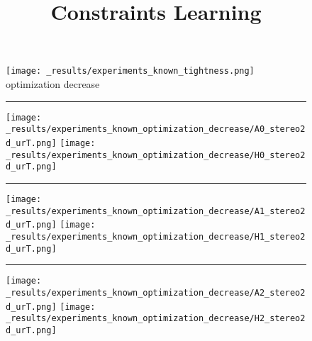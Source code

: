 \documentclass[11pt]{article}
\title{Constraints Learning}
\begin{document}
  
\maketitle

\newpage
\FloatBarrier
\begin{figure}[h]
  \centering
  \texttt{[image: \_results/experiments\_known\_tightness.png]} \\
  optimization decrease \\
  \hrule
  \texttt{[image: \_results/experiments\_known\_optimization\_decrease/A0\_stereo2d\_urT.png]}
  \texttt{[image: \_results/experiments\_known\_optimization\_decrease/H0\_stereo2d\_urT.png]} \\
  \hrule
  \texttt{[image: \_results/experiments\_known\_optimization\_decrease/A1\_stereo2d\_urT.png]}
  \texttt{[image: \_results/experiments\_known\_optimization\_decrease/H1\_stereo2d\_urT.png]} \\
  \hrule
  \texttt{[image: \_results/experiments\_known\_optimization\_decrease/A2\_stereo2d\_urT.png]}
  \texttt{[image: \_results/experiments\_known\_optimization\_decrease/H2\_stereo2d\_urT.png]} \\
  \label{fig:dual_decrease}
\end{figure}
\end{document}
